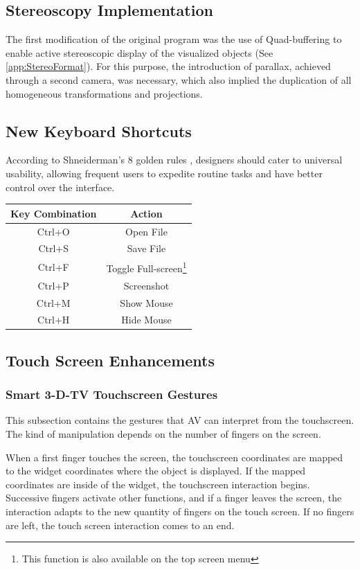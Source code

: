 \documentclass[12pt]{extarticle}
\begin{document}
\subsection {Stereoscopy Implementation}
The first modification of the original program was the use of Quad-buffering to enable active stereoscopic display of the visualized objects (See \ref{app:StereoFormat}). For this purpose, the introduction of parallax, achieved through a second camera, was necessary, which also implied the duplication of all homogeneous transformations and projections.

\subsection {New Keyboard Shortcuts}
According to Shneiderman's 8 golden rules \cite{Shneiderman}, designers should cater to universal usability, allowing frequent users to expedite routine tasks and have better control over the interface.
\begin{center}

\begin{tabular}{|c|c|} \hline
\textbf{Key Combination} & \textbf{Action}\\ \hline
Ctrl+O & Open File\\\hline
Ctrl+S & Save File\\\hline
Ctrl+F & Toggle Full-screen\footnote{This function is also available on the top screen menu}\\\hline
Ctrl+P & Screenshot\\\hline
Ctrl+M & Show Mouse\\\hline
Ctrl+H & Hide Mouse\\\hline

\end{tabular}
\end{center}


\subsection {Touch Screen Enhancements}

\subsubsection {Smart 3-D-TV Touchscreen Gestures}
This subsection contains the gestures that AV can interpret from the touchscreen. The kind of manipulation depends on the number of fingers on the screen. 

When a first finger touches the screen, the touchscreen coordinates are mapped to the widget coordinates where the object is displayed. If the mapped coordinates are inside of the widget, the touchscreen interaction begins. Successive fingers activate other functions, and if a finger leaves the screen, the interaction adapts to the new quantity of fingers on the touch screen. If no fingers are left, the touch screen interaction comes to an end.
\end{document}
